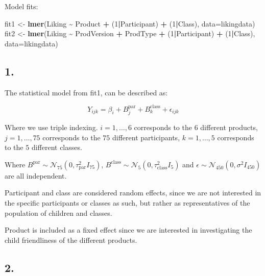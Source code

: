 \documentclass[
]{article}
\newenvironment{Shaded}{\begin{snugshade}}{\end{snugshade}}
\newcommand{\AttributeTok}[1]{\textcolor[rgb]{0.13,0.29,0.53}{#1}}
\newcommand{\DecValTok}[1]{\textcolor[rgb]{0.00,0.00,0.81}{#1}}
\newcommand{\FunctionTok}[1]{\textcolor[rgb]{0.13,0.29,0.53}{\textbf{#1}}}
\newcommand{\NormalTok}[1]{#1}
\newcommand{\OtherTok}[1]{\textcolor[rgb]{0.56,0.35,0.01}{#1}}
\newcommand{\SpecialCharTok}[1]{\textcolor[rgb]{0.81,0.36,0.00}{\textbf{#1}}}
\begin{document}
Model fits:

\begin{Shaded}
\begin{Highlighting}[]
\NormalTok{fit1 }\OtherTok{\textless{}{-}} \FunctionTok{lmer}\NormalTok{(Liking }\SpecialCharTok{\textasciitilde{}}\NormalTok{ Product }\SpecialCharTok{+}\NormalTok{ (}\DecValTok{1}\SpecialCharTok{|}\NormalTok{Participant) }\SpecialCharTok{+}\NormalTok{ (}\DecValTok{1}\SpecialCharTok{|}\NormalTok{Class), }\AttributeTok{data=}\NormalTok{likingdata)}
\NormalTok{fit2 }\OtherTok{\textless{}{-}} \FunctionTok{lmer}\NormalTok{(Liking }\SpecialCharTok{\textasciitilde{}}\NormalTok{ ProdVersion }\SpecialCharTok{+}\NormalTok{ ProdType }\SpecialCharTok{+}\NormalTok{ (}\DecValTok{1}\SpecialCharTok{|}\NormalTok{Participant) }\SpecialCharTok{+}\NormalTok{ (}\DecValTok{1}\SpecialCharTok{|}\NormalTok{Class), }\AttributeTok{data=}\NormalTok{likingdata)}
\end{Highlighting}
\end{Shaded}

\subsection{1.}\label{section-1}

The statistical model from fit1, can be described as:

\[Y_{ijk} = \beta_{i} + B_{j}^{\text{par}} + B_{k}^{\text{class}} + \epsilon_{ijk}\]

Where we use triple indexing. \(i=1,\ldots, 6\) corresponds to the \(6\)
different products, \(j=1,\ldots,75\) corresponds to the \(75\)
different participants, \(k=1,\ldots,5\) corresponds to the \(5\)
different classes.

Where
\(B^{\text{par}} \sim \mathcal{N}_{75}(0, \tau_{\text{par}}^2 I_{75})\),
\(B^{\text{class}} \sim \mathcal{N}_{5}(0, \tau_{\text{class}}^2 I_{5})\)
and \(\epsilon \sim \mathcal{N}_{450}(0, \sigma^2 I_{450})\) are all
independent.

Participant and class are considered random effects, since we are not
interested in the specific participants or classes as such, but rather
as representatives of the population of children and classes.

Product is included as a fixed effect since we are interested in
investigating the child friendliness of the different products.

\subsection{2.}\label{section-2}
\end{document}
